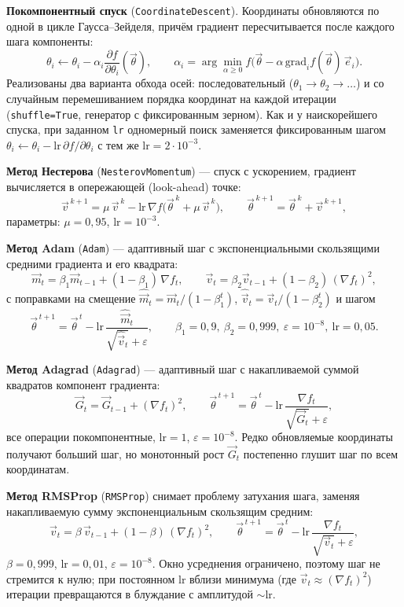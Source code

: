 \documentclass[a4paper]{article}
\begin{document}
\textbf{Покомпонентный спуск} (\texttt{CoordinateDescent}). Координаты обновляются по одной в цикле Гаусса–Зейделя, причём градиент пересчитывается после каждого шага компоненты:
\[
    \theta_i \leftarrow \theta_i - \alpha_i \frac{\partial f}{\partial \theta_i}(\vec{\theta}),
    \qquad
    \alpha_i = \arg\min_{\alpha \ge 0} f\bigl(\vec{\theta} - \alpha\, \text{grad}_i f(\vec{\theta})\, \vec{e}_i\bigr).
\]
Реализованы два варианта обхода осей: последовательный ($\theta_1 \to \theta_2 \to \dots$) и со случайным перемешиванием порядка координат на каждой итерации (\texttt{shuffle=True}, генератор с фиксированным зерном). Как и у наискорейшего спуска, при заданном \texttt{lr} одномерный поиск заменяется фиксированным шагом $\theta_i \leftarrow \theta_i - \text{lr}\, \partial f / \partial \theta_i$ с тем же $\text{lr} = 2\cdot10^{-3}$.

\textbf{Метод Нестерова} (\texttt{NesterovMomentum}) — спуск с ускорением, градиент вычисляется в опережающей (look-ahead) точке:
\[
    \vec{v}^{\,k+1} = \mu\, \vec{v}^{\,k} - \text{lr}\, \nabla f\bigl(\vec{\theta}^{\,k} + \mu\, \vec{v}^{\,k}\bigr),
    \qquad
    \vec{\theta}^{\,k+1} = \vec{\theta}^{\,k} + \vec{v}^{\,k+1},
\]
параметры: $\mu = 0{,}95$, $\text{lr} = 10^{-3}$.

\textbf{Метод Adam} (\texttt{Adam}) — адаптивный шаг с экспоненциальными скользящими средними градиента и его квадрата:
\[
    \vec{m}_t = \beta_1 \vec{m}_{t-1} + (1-\beta_1)\, \nabla f_t,
    \qquad
    \vec{v}_t = \beta_2 \vec{v}_{t-1} + (1-\beta_2)\, (\nabla f_t)^2,
\]
с поправками на смещение $\hat{\vec{m}}_t = \vec{m}_t / (1-\beta_1^t)$, $\hat{\vec{v}}_t = \vec{v}_t / (1-\beta_2^t)$ и шагом
\[
    \vec{\theta}^{\,t+1} = \vec{\theta}^{\,t} - \text{lr}\, \frac{\hat{\vec{m}}_t}{\sqrt{\hat{\vec{v}}_t} + \varepsilon},
    \qquad
    \beta_1 = 0{,}9,\ \beta_2 = 0{,}999,\ \varepsilon = 10^{-8},\ \text{lr} = 0{,}05.
\]

\textbf{Метод Adagrad} (\texttt{Adagrad}) — адаптивный шаг с накапливаемой суммой квадратов компонент градиента:
\[
    \vec{G}_t = \vec{G}_{t-1} + (\nabla f_t)^2,
    \qquad
    \vec{\theta}^{\,t+1} = \vec{\theta}^{\,t} - \text{lr}\, \frac{\nabla f_t}{\sqrt{\vec{G}_t} + \varepsilon},
\]
все операции покомпонентные, $\text{lr} = 1$, $\varepsilon = 10^{-8}$. Редко обновляемые координаты получают больший шаг, но монотонный рост $\vec{G}_t$ постепенно глушит шаг по всем координатам.

\textbf{Метод RMSProp} (\texttt{RMSProp}) снимает проблему затухания шага, заменяя накапливаемую сумму экспоненциальным скользящим средним:
\[
    \vec{v}_t = \beta\, \vec{v}_{t-1} + (1-\beta)\, (\nabla f_t)^2,
    \qquad
    \vec{\theta}^{\,t+1} = \vec{\theta}^{\,t} - \text{lr}\, \frac{\nabla f_t}{\sqrt{\vec{v}_t} + \varepsilon},
\]
$\beta = 0{,}999$, $\text{lr} = 0{,}01$, $\varepsilon = 10^{-8}$. Окно усреднения ограничено, поэтому шаг не стремится к нулю; при постоянном $\text{lr}$ вблизи минимума (где $\vec{v}_t \approx (\nabla f_t)^2$) итерации превращаются в блуждание с амплитудой $\sim \text{lr}$.
\end{document}
